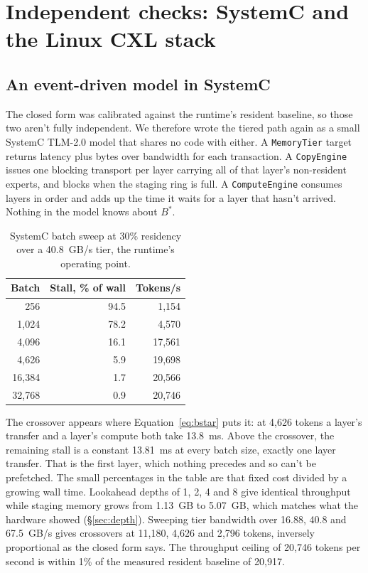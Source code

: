 \documentclass[10pt,a4paper]{article}
\begin{document}
\section{Independent checks: SystemC and the Linux CXL stack}

\subsection{An event-driven model in SystemC}
\label{sec:systemc}

The closed form was calibrated against the runtime's resident baseline, so those
two aren't fully independent. We therefore wrote the tiered path again as a small
SystemC TLM-2.0 model that shares no code with either. A \texttt{MemoryTier}
target returns latency plus bytes over bandwidth for each transaction. A
\texttt{CopyEngine} issues one blocking transport per layer carrying all of that
layer's non-resident experts, and blocks when the staging ring is full. A
\texttt{ComputeEngine} consumes layers in order and adds up the time it waits for
a layer that hasn't arrived. Nothing in the model knows about $B^{*}$.

\begin{table}[htbp]
\centering\small
\caption{SystemC batch sweep at 30\% residency over a 40.8~GB/s tier, the runtime's
operating point.}
\label{tab:systemc}
\begin{tabular}{rrr}
\toprule
Batch & Stall, \% of wall & Tokens/s \\
\midrule
256      & 94.5 &  1{,}154 \\
1{,}024  & 78.2 &  4{,}570 \\
4{,}096  & 16.1 & 17{,}561 \\
4{,}626  &  5.9 & 19{,}698 \\
16{,}384 &  1.7 & 20{,}566 \\
32{,}768 &  0.9 & 20{,}746 \\
\bottomrule
\end{tabular}
\end{table}

The crossover appears where Equation~\ref{eq:bstar} puts it: at 4{,}626 tokens a
layer's transfer and a layer's compute both take 13.8~ms. Above the
crossover, the remaining stall is a constant 13.81~ms at every batch size, exactly
one layer transfer. That is the first layer, which nothing precedes and so can't be
prefetched. The small percentages in the table are that fixed cost divided by a
growing wall time. Lookahead depths of 1, 2, 4 and 8 give identical throughput
while staging memory grows from 1.13~GB to 5.07~GB, which matches what the
hardware showed (\S\ref{sec:depth}). Sweeping tier bandwidth over 16.88, 40.8 and
67.5~GB/s gives crossovers at 11{,}180, 4{,}626 and 2{,}796 tokens, inversely
proportional as the closed form says. The throughput ceiling of 20{,}746 tokens per
second is within 1\% of the measured resident baseline of 20{,}917.
\end{document}
